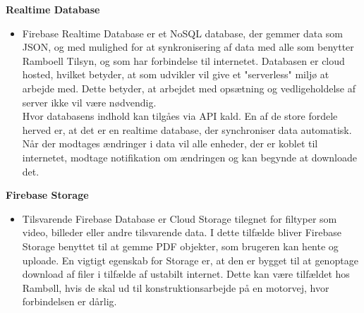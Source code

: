 \textbf{Realtime Database\cite{FirebaseRealtimeDB}}
\begin{itemize}[-]
	\itemsep 0.3em 
	\item[]  Firebase Realtime Database er et NoSQL database, der gemmer data som JSON\cite{JSON}, og med mulighed for at synkronisering af data med alle som benytter Ramboell Tilsyn, og som har forbindelse til internetet. Databasen er cloud hosted, hvilket betyder, at som udvikler vil give et "serverless" miljø at arbejde med. Dette betyder, at arbejdet med opsætning og vedligeholdelse af server ikke vil være nødvendig. \\ 
	Hvor databasens indhold kan tilgåes via API kald. 
	En af de store fordele herved er, at det er en realtime database, der synchroniser data automatisk. Når der modtages ændringer i data vil alle enheder, der er koblet til internetet, modtage notifikation om ændringen og kan begynde at downloade det. 
\end{itemize}

\textbf{Firebase Storage\cite{FirebaseStorage}}
\begin{itemize}[-]
	\itemsep 0.3em 
	\item[] Tilsvarende Firebase Database er Cloud Storage tilegnet for filtyper som video, billeder eller andre tilsvarende data. I dette tilfælde bliver Firebase Storage benyttet til at gemme PDF objekter, som brugeren kan hente og uploade. En vigtigt egenskab for Storage er, at den er bygget til at genoptage download af filer i tilfælde af ustabilt internet. Dette kan være tilfældet hos Rambøll, hvis de skal ud til konstruktionsarbejde på en motorvej, hvor forbindelsen er dårlig. \\
\end{itemize}
\clearpage

